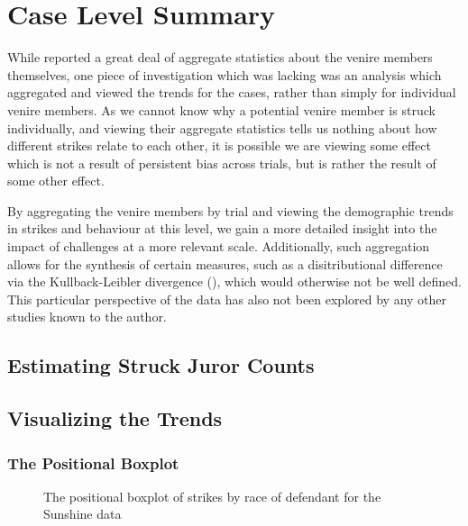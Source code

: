 \section{Case Level Summary} \label{sec:casesum}

While \cite{JurySunshineProj} reported a great deal of aggregate statistics about the venire members themselves, one piece of
investigation which was lacking was an analysis which aggregated and viewed the trends for the cases, rather than simply for
individual venire members. As we cannot know why a potential venire member is struck individually, and viewing their aggregate
statistics tells us nothing about how different strikes relate to each other, it is possible we are viewing some effect which is
not a result of persistent bias across trials, but is rather the result of some other effect.

By aggregating the venire members by trial and viewing the demographic trends in strikes and behaviour at this level, we gain a
more detailed insight into the impact of challenges at a more relevant scale. Additionally, such aggregation allows for the
synthesis of certain measures, such as a disitributional difference via the Kullback-Leibler divergence (\cite{kullback1951}),
which would otherwise not be well defined. This particular perspective of the data has also not been explored by any other studies
known to the author.

\subsection{Estimating Struck Juror Counts} \label{subsec:struckjur}

\subsection{Visualizing the Trends} \label{subsec:vistrend}

\subsubsection{The Positional Boxplot}

\begin{figure}[h!]
  \centering
  \caption[Prosecution and Defence Strikes by Trial]{The positional boxplot of strikes by race of defendant for the Sunshine data}
  \label{fig:trialprodef}
\end{figure}

